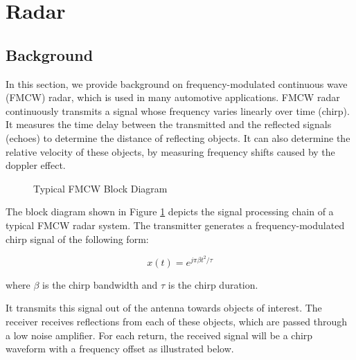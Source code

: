 \documentclass[conference]{IEEEtran}
\begin{document}
  \section {Radar}
   \subsection {Background}
   
In this section, we provide background on frequency-modulated continuous wave (FMCW) radar, which is used in many automotive applications. FMCW radar continuously transmits a signal whose frequency varies linearly over time (chirp). It measures the time delay between the transmitted and the reflected signals (echoes) to determine the distance of reflecting objects. It can also determine the relative velocity of these objects, by measuring frequency shifts caused by the doppler effect.

	\begin{figure}[H]
    		\centering
    		\caption{Typical FMCW Block Diagram \cite{9613183}}
    		\label{fig::fmcw_radar}
	\end{figure}
	
 The block diagram shown in Figure \ref{fig::fmcw_radar} depicts the signal processing chain of a typical FMCW radar system. The transmitter generates a frequency-modulated chirp signal of the following form:
 
 	\begin{equation}
 		x(t) = e^{j\pi{\beta}t^2/\tau}
 		\label{eq::chirp}
 	\end{equation}
 	
 	where $\beta$ is the chirp bandwidth and $\tau$ is the chirp duration.
 	
	It transmits this signal out of the antenna towards objects of interest. The receiver receives reflections from each of these objects, which are passed through a low noise amplifier. For each return, the received signal will be a chirp waveform with a frequency offset as illustrated below.
	
\end{document}
